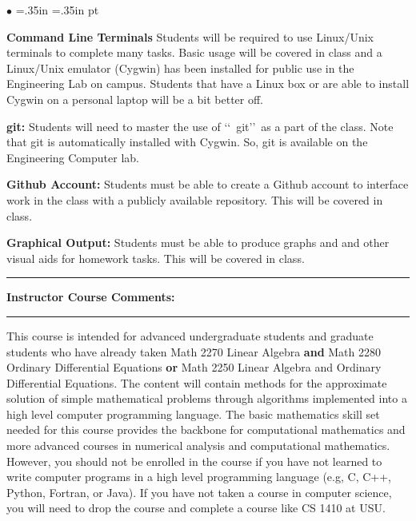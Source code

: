 \documentclass[10pt,fleqn]{article}
\begin{document}
\medskip

\noindent
\begin{list}{$\bullet$}{ \parsep=0pt \listparindent=0pt
\topsep=0pt \rightmargin=.35in \leftmargin=.35in   pt \itemsep=2pt}
  \item {\bf Command Line Terminals} Students will be required to use
        Linux/Unix terminals to complete many tasks. Basic usage will be
        covered in class and a Linux/Unix emulator (Cygwin) has been installed
        for public use in the Engineering Lab on campus. Students that have a
        Linux box or are able to install Cygwin on a personal laptop will be a
        bit better off.
  \item {\bf git:} Students will need to master the use of \lq\lq\ git\rq\rq\
        as a part of the class. Note that git is automatically installed with
        Cygwin. So, git is available on the Engineering Computer lab. 
  \item {\bf Github Account:} Students must be able to create a Github account
        to interface work in the class with a publicly available repository.
        This will be covered in class.
  \item {\bf Graphical Output:} Students must be able to produce graphs and
        and other visual aids for homework tasks. This will be covered in class.
\end{list}

\medskip
\vskip0.1in\hrule\vskip0.1in \noindent
{\bf Instructor Course Comments:}
\vskip0.1in\hrule\vskip0.1in
\noindent
This course is intended for advanced undergraduate students and graduate
students who have already taken Math 2270 Linear Algebra {\bf and} Math 2280
Ordinary Differential Equations {\bf or} Math 2250 Linear Algebra and Ordinary
Differential Equations. The content will contain methods for the approximate
solution of simple mathematical problems through algorithms implemented into a
high level computer programming language. The basic mathematics skill set needed
for this course provides the backbone for computational mathematics and more
advanced courses in numerical analysis and computational mathematics. However,
you should not be enrolled in the course if you have not learned to write
computer programs in a high level programming language (e.g, C, C++, Python,
Fortran, or Java). If you have not taken a course in computer science, you will
need to drop the course and complete a course like CS 1410 at USU.
\end{document}
